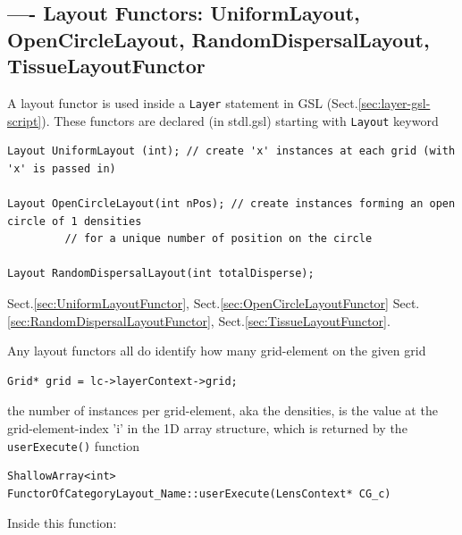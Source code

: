 \subsection{---- Layout Functors: UniformLayout, OpenCircleLayout, RandomDispersalLayout, TissueLayoutFunctor}
\label{sec:functor-layout}
\label{sec:Layout-functor}
\label{sec:doLayout-method}

A layout functor is used inside a \verb!Layer! statement in GSL (Sect.\ref{sec:layer-gsl-script}). 
These functors are declared (in stdl.gsl) starting with 
\verb!Layout! keyword
\begin{verbatim}
Layout UniformLayout (int); // create 'x' instances at each grid (with 'x' is passed in)

Layout OpenCircleLayout(int nPos); // create instances forming an open circle of 1 densities
         // for a unique number of position on the circle
         
Layout RandomDispersalLayout(int totalDisperse); 
\end{verbatim}
Sect.\ref{sec:UniformLayoutFunctor}, Sect.\ref{sec:OpenCircleLayoutFunctor} Sect.\ref{sec:RandomDispersalLayoutFunctor}, Sect.\ref{sec:TissueLayoutFunctor}.


Any layout functors all do identify how many grid-element on the given grid

\begin{verbatim}
Grid* grid = lc->layerContext->grid;
\end{verbatim}

the number of instances per grid-element, aka the densities, is the value at the grid-element-index 'i'
in the 1D array structure, which is returned by the \verb!userExecute()! function
\begin{verbatim}
ShallowArray<int>   FunctorOfCategoryLayout_Name::userExecute(LensContext* CG_c)
\end{verbatim}
Inside this function:

